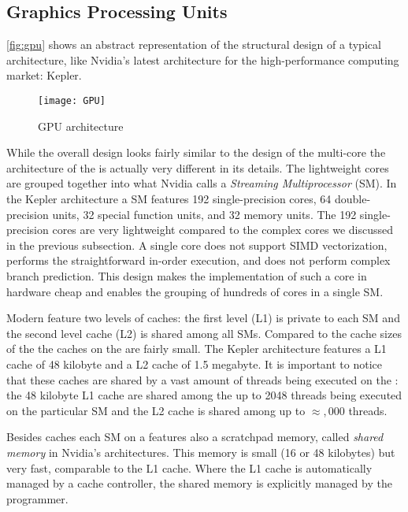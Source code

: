 \subsection{Graphics Processing Units}
\autoref{fig:gpu} shows an abstract representation of the structural design of a typical \GPU architecture, like Nvidia's latest \GPU architecture for the high-performance computing market: Kepler.
\begin{figure}
  \centering
  \texttt{[image: GPU]}
  \caption{GPU architecture}
  \label{fig:gpu}
\end{figure}
While the overall design looks fairly similar to the design of the multi-core \CPU the architecture of the \GPU is actually very different in its details.
The lightweight \GPU cores are grouped together into what Nvidia calls a \emph{Streaming Multiprocessor} (SM).
In the Kepler architecture a SM features 192 single-precision cores, 64 double-precision units, 32 special function units, and 32 memory units.
The 192 single-precision cores are very lightweight compared to the complex \CPU cores we discussed in the previous subsection.
A single \GPU core does not support SIMD vectorization, performs the straightforward in-order execution, and does not perform complex branch prediction.
This design makes the implementation of such a core in hardware cheap and enables the grouping of hundreds of cores in a single SM.

Modern \GPUs feature two levels of caches:
the first level (L1) is private to each SM and the second level cache (L2) is shared among all SMs.
Compared to the cache sizes of the \CPU the caches on the \GPU are fairly small.
The Kepler architecture features a L1 cache of 48 kilobyte and a L2 cache of 1.5 megabyte.
It is important to notice that these caches are shared by a vast amount of threads being executed on the \GPU:
the 48 kilobyte L1 cache are shared among the up to 2048 threads being executed on the particular SM and the L2 cache is shared among up to $\approx{}$,\,000 threads.

Besides caches each SM on a \GPU features also a scratchpad memory, called \emph{shared memory} in Nvidia's \GPU architectures.
This memory is small (16 or 48 kilobytes) but very fast, comparable to the L1 cache.
Where the L1 cache is automatically managed by a cache controller, the shared memory is explicitly managed by the programmer.

